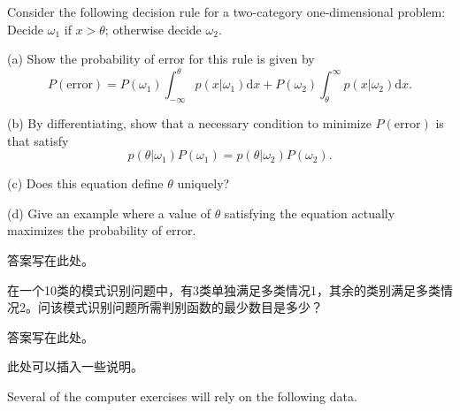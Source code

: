 \documentclass{hw}
\begin{document}
	

\maketitle

\makeproblem

\begin{problem*}
Consider the following decision rule for a two-category one-dimensional problem: 
Decide \(\omega_1\) if \(x > \theta\); otherwise decide \(\omega_2\).

(a) Show the probability of error for this rule is given by
\[
P(\text{error}) = P\left(\omega_{1}\right) \int_{-\infty}^{\theta} p\left(x | \omega_{1}\right) \mathrm{d}x+P\left(\omega_{2}\right) \int_{\theta}^{\infty} p\left(x | \omega_{2}\right) \mathrm{d}x.
\]

(b) By differentiating, show that a necessary condition to minimize \(P(\text{error})\) is that satisfy
\[
p(\theta | \omega_1) P(\omega_1) = p(\theta | \omega_2) P(\omega_2).
\]

(c) Does this equation define \(\theta\) uniquely?

(d) Give an example where a value of \(\theta\) satisfying the equation actually maximizes the probability of error.
\end{problem*}

\begin{answer}
答案写在此处。
\end{answer}

\begin{problem}[标题]
在一个10类的模式识别问题中，有3类单独满足多类情况1，其余的类别满足多类情况2。问该模式识别问题所需判别函数的最少数目是多少？
\end{problem}

\begin{answer}
答案写在此处。
\end{answer}

\makecomputerexercise

此处可以插入一些说明。

Several of the computer exercises will rely on the following data.
\end{document}
